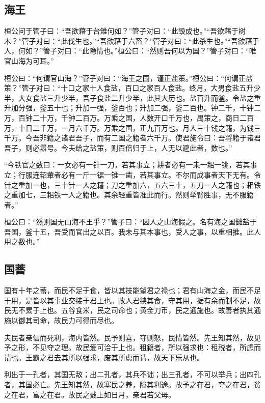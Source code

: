 \documentclass[]{article}
\begin{document}
\hypertarget{header-n966}{%
\subsection{海王 }\label{header-n966}}

桓公问于管子曰：``吾欲藉于台雉何如？''管子对曰：``此毁成也。''``吾欲藉于树木？''管子对曰：``此伐生也。''``吾欲藉于六畜？''管子对曰：``此杀生也。''``吾欲藉于人，何如？''管子对曰：``此隐情也。''桓公曰：``然则吾何以为国？''管子对曰：``唯官山海为可耳。''

桓公曰：``何谓官山海？''管子对曰：``海王之国，谨正盐策。''桓公曰：``何谓正盐策？''管子对曰：``十口之家十人食盐，百口之家百人食盐。终月，大男食盐五升少半，大女食盐三升少半，吾子食盐二升少半，此其大历也。盐百升而釜。令盐之重升加分强，釜五十也；升加一强，釜百也；升加二强，釜二百也。钟二千，十钟二万，百钟二十万，千钟二百万。万乘之国，人数开口千万也，禺策之，商日二百万，十日二千万，一月六千万。万乘之国，正九百万也。月人三十钱之籍，为钱三千万。今吾非籍之诸君吾子，而有二国之籍者六千万。使君施令曰：吾将籍于诸君吾子，则必嚣号。今夫给之盐策，则百倍归于上，人无以避此者，数也。''

``今铁官之数曰：一女必有一针一刀，若其事立；耕者必有一耒一耜一铫，若其事立；行服连轺輂者必有一斤一锯一锥一凿，若其事立。不尔而成事者天下无有。令针之重加一也，三十针一人之籍；刀之重加六，五六三十，五刀一人之籍也；耜铁之重加七，三耜铁一人之籍也。其余轻重皆准此而行。然则举臂胜事，无不服籍者。''

桓公曰：``然则国无山海不王乎？''管子曰：``因人之山海假之。名有海之国雠盐于吾国，釜十五，吾受而官出之以百。我未与其本事也，受人之事，以重相推。此人用之数也。''

\hypertarget{header-n973}{%
\subsection{国蓄}\label{header-n973}}

国有十年之蓄，而民不足于食，皆以其技能望君之禄也；君有山海之金，而民不足于用，是皆以其事业交接于君上也。故人君挟其食，守其用，据有余而制不足，故民无不累于上也。五谷食米，民之司命也；黄金刀币，民之通施也。故善者执其通施以御其司命，故民力可得而尽也。

夫民者亲信而死利，海内皆然。民予则喜，夺则怒，民情皆然。先王知其然，故见予之形，不见夺之理。故民爱可洽于上也。租籍者，所以强求也：租税者，所虑而请也。王霸之君去其所以强求，废其所虑而请，故天下乐从也。

利出于一孔者，其国无敌；出二孔者，其兵不诎；出三孔者，不可以举兵；出四孔者，其国必亡。先王知其然，故塞民之养，隘其利途。故予之在君，夺之在君，贫之在君，富之在君。故民之戴上如日月，亲君若父母。
\end{document}
